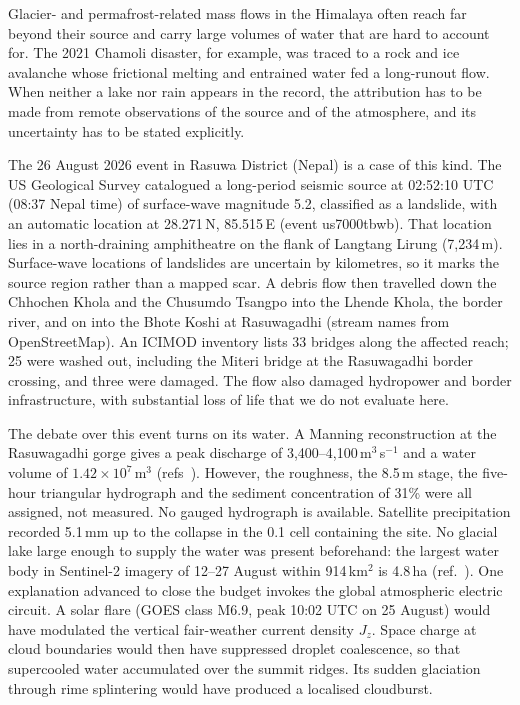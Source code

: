 \documentclass{nature}
\begin{document}
Glacier- and permafrost-related mass flows in the Himalaya often reach far beyond their source and carry large volumes of water that are hard to account for. The 2021 Chamoli disaster, for example, was traced to a rock and ice avalanche whose frictional melting and entrained water fed a long-runout flow\cite{shugar2021}. When neither a lake nor rain appears in the record, the attribution has to be made from remote observations of the source and of the atmosphere, and its uncertainty has to be stated explicitly.

The 26 August 2026 event in Rasuwa District (Nepal) is a case of this kind. The US Geological Survey catalogued a long-period seismic source at 02:52:10 UTC (08:37 Nepal time) of surface-wave magnitude 5.2, classified as a landslide, with an automatic location at 28.271\textdegree\,N, 85.515\textdegree\,E (event us7000tbwb)\cite{usgs2026}. That location lies in a north-draining amphitheatre on the flank of Langtang Lirung (7,234\,m). Surface-wave locations of landslides are uncertain by kilometres\cite{ekstrom2013}, so it marks the source region rather than a mapped scar. A debris flow then travelled down the Chhochen Khola and the Chusumdo Tsangpo into the Lhende Khola, the border river, and on into the Bhote Koshi at Rasuwagadhi (stream names from OpenStreetMap\cite{osm2026}). An ICIMOD inventory lists 33 bridges along the affected reach; 25 were washed out, including the Miteri bridge at the Rasuwagadhi border crossing, and three were damaged. The flow also damaged hydropower and border infrastructure, with substantial loss of life that we do not evaluate here.

The debate over this event turns on its water. A Manning reconstruction at the Rasuwagadhi gorge gives a peak discharge of 3,400--4,100\,m$^{3}$\,s$^{-1}$ and a water volume of $1.42\times10^{7}$\,m$^{3}$ (refs~). However, the roughness, the 8.5\,m stage, the five-hour triangular hydrograph and the sediment concentration of 31\% were all assigned, not measured. No gauged hydrograph is available. Satellite precipitation recorded 5.1\,mm up to the collapse in the 0.1\textdegree{} cell containing the site\cite{huffman2019}. No glacial lake large enough to supply the water was present beforehand: the largest water body in Sentinel-2 imagery of 12--27 August within 914\,km$^{2}$ is 4.8\,ha (ref.~). One explanation advanced to close the budget invokes the global atmospheric electric circuit\cite{rycroft2000}. A solar flare (GOES class M6.9, peak 10:02 UTC on 25 August) would have modulated the vertical fair-weather current density $J_z$. Space charge at cloud boundaries\cite{zhou2007} would then have suppressed droplet coalescence\cite{tinsley2000,tinsley2008,harrison2008}, so that supercooled water accumulated over the summit ridges. Its sudden glaciation through rime splintering\cite{hallett1974,field2017} would have produced a localised cloudburst.
\end{document}
